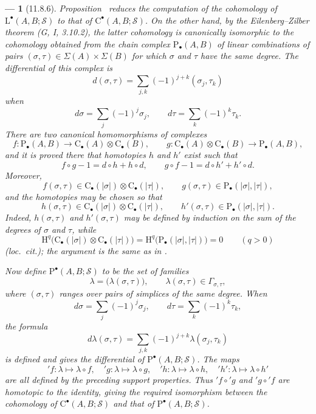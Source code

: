 \documentclass[oneside]{amsart}
\theoremstyle{ega-env-style}
\newtheorem*{env}{---}
\theoremstyle{ega-thm-env-style}
\theoremstyle{ega-defn-env-style}
\def\mathcal{\mathscr}
\def\sh{\mathcal}                   %
\def\HH{\mathrm{H}}                 %
\newcommand{\oldpage}[2][]{{\marginnote{\normalfont{\textbf{#1}~|~#2}}}\ignorespaces}
\let\EGAOriginalLabel\label
\renewcommand{\label}[1]{\phantomsection\EGAOriginalLabel{#1}}
\begin{document}
\begin{env}[11.8.6]
\label{0.11.8.6}
\oldpage[0\textsubscript{III}]{45}
Proposition~ reduces the computation of the cohomology of
$\mathrm{L}^\bullet(A,B;\sh{S})$ to that of
$\mathrm{C}^\bullet(A,B;\sh{S})$.
On the other hand, by the Eilenberg--Zilber theorem
(G, I, 3.10.2), the latter cohomology is canonically isomorphic to the
cohomology obtained from the chain complex
$\mathrm{P}_\bullet(A,B)$ of linear combinations of pairs
$(\sigma,\tau)\in\Sigma(A)\times\Sigma(B)$ for which $\sigma$ and
$\tau$ have the same degree.
The differential of this complex is
\[
  d(\sigma,\tau)
  =
  \sum_{j,k}(-1)^{j+k}(\sigma_j,\tau_k)
\]
when
\[
  d\sigma=\sum_j(-1)^j\sigma_j,
  \qquad
  d\tau=\sum_k(-1)^k\tau_k.
\]
There are two canonical homomorphisms of complexes
\[
  f:\mathrm{P}_\bullet(A,B)
  \longrightarrow
  \mathrm{C}_\bullet(A)\otimes\mathrm{C}_\bullet(B),
  \qquad
  g:\mathrm{C}_\bullet(A)\otimes\mathrm{C}_\bullet(B)
  \longrightarrow
  \mathrm{P}_\bullet(A,B),
\]
and it is proved there that homotopies $h$ and $h'$ exist such that
\[
  f\circ g-1=d\circ h+h\circ d,
  \qquad
  g\circ f-1=d\circ h'+h'\circ d.
\]
Moreover,
\[
  f(\sigma,\tau)
  \in
  \mathrm{C}_\bullet(|\sigma|)
  \otimes
  \mathrm{C}_\bullet(|\tau|),
  \qquad
  g(\sigma,\tau)
  \in
  \mathrm{P}_\bullet(|\sigma|,|\tau|),
\]
and the homotopies may be chosen so that
\[
  h(\sigma,\tau)
  \in
  \mathrm{C}_\bullet(|\sigma|)
  \otimes
  \mathrm{C}_\bullet(|\tau|),
  \qquad
  h'(\sigma,\tau)
  \in
  \mathrm{P}_\bullet(|\sigma|,|\tau|).
\]
Indeed, $h(\sigma,\tau)$ and $h'(\sigma,\tau)$ may be defined by
induction on the sum of the degrees of $\sigma$ and $\tau$, while
\[
  \HH^q\bigl(
    \mathrm{C}_\bullet(|\sigma|)
    \otimes
    \mathrm{C}_\bullet(|\tau|)
  \bigr)
  =
  \HH^q\bigl(\mathrm{P}_\bullet(|\sigma|,|\tau|)\bigr)
  =
  0
  \qquad(q>0)
\]
(\emph{loc.\ cit.}); the argument is the same as in
.

Now define $\mathrm{P}^\bullet(A,B;\sh{S})$ to be the set of families
\[
  \lambda=\bigl(\lambda(\sigma,\tau)\bigr),
  \qquad
  \lambda(\sigma,\tau)\in\Gamma_{\sigma,\tau},
\]
where $(\sigma,\tau)$ ranges over pairs of simplices of the same degree.
When
\[
  d\sigma=\sum_j(-1)^j\sigma_j,
  \qquad
  d\tau=\sum_k(-1)^k\tau_k,
\]
the formula
\[
  d\lambda(\sigma,\tau)
  =
  \sum_{j,k}(-1)^{j+k}\lambda(\sigma_j,\tau_k)
\]
is defined and gives the differential of
$\mathrm{P}^\bullet(A,B;\sh{S})$.
The maps
\[
  {}'\!f:\lambda\longmapsto\lambda\circ f,\quad
  {}'\!g:\lambda\longmapsto\lambda\circ g,\quad
  {}'\!h:\lambda\longmapsto\lambda\circ h,\quad
  {}'\!h':\lambda\longmapsto\lambda\circ h'
\]
are all defined by the preceding support properties.
Thus ${}'\!f\circ{}'\!g$ and ${}'\!g\circ{}'\!f$ are homotopic to the
identity, giving the required isomorphism between the cohomology of
$\mathrm{C}^\bullet(A,B;\sh{S})$ and that of
$\mathrm{P}^\bullet(A,B;\sh{S})$.
\end{env}
\end{document}
